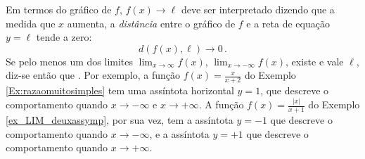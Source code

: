 Em termos do gráfico de $f$, $f(x)\to \ell$ 
deve ser interpretado dizendo que a medida que $x$ aumenta, 
a \emph{distância} entre o gráfico de $f$ e a reta de equação 
$y=\ell$ tende a zero:
$$d(f(x),\ell)\to 0\,.$$
Se pelo menos um dos limites $\lim_{x\to \infty}f(x)$,
$\lim_{x\to -\infty}f(x)$, existe e vale $\ell$, 
diz-se então que .
Por exemplo, a função $f(x)=\frac{x}{x+2}$ do Exemplo
\ref{Ex:razaomuitosimples} tem uma assíntota horizontal $y=1$, que
descreve o comportamento quando $x\to-\infty$ e
$x\to+\infty$. 
A função $f(x)=\frac{|x|}{x+1}$ do Exemplo \ref{ex_LIM_deuxassymp},
por sua vez, tem a assíntota $y=-1$ que descreve o comportamento
quando $x\to-\infty$, e
a assíntota $y=+1$ que descreve o comportamento quando $x\to+\infty$.

%


